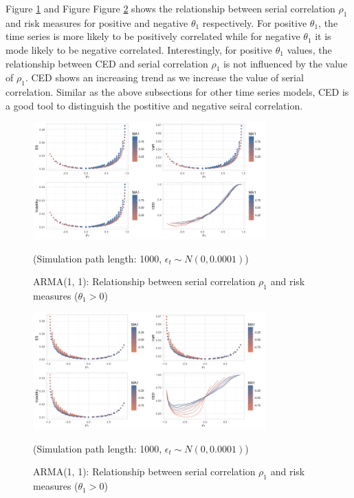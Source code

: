 \documentclass[11pt]{article}
\begin{document}
Figure \ref{fig:AR1MA1_risk_measures_pos} and Figure Figure \ref{fig:AR1MA1_risk_measures_neg} shows the relationship between serial correlation $\rho_1$ and risk measures for positive and negative $\theta_1$ respectively. For positive $\theta_1$, the time series is more likely to be positively correlated while for negative $\theta_1$ it is mode likely to be negative correlated. Interestingly, for positive $\theta_1$ values, the relationship between CED and serial correlation $\rho_1$ is not influenced by the value of $\rho_1$. CED shows an increasing trend as we increase the value of serial correlation. Similar as the above subsections for other time series models, CED is a good tool to distinguish the postitive and negative seiral correlation.

\begin{figure}[H]
\centering
\includegraphics[width = 0.8\textwidth]{../figures/simulation/AR1MA1_risk_measures_pos}
\caption{ARMA(1, 1): Relationship between serial correlation $\rho_1$ and risk measures ($\theta_1>0$)}
(Simulation path length: 1000, $\epsilon_t \sim N(0, 0.0001)$)
\label{fig:AR1MA1_risk_measures_pos}
\end{figure}

\begin{figure}[H]
\centering
\includegraphics[width = 0.8\textwidth]{../figures/simulation/AR1MA1_risk_measures_neg}
\caption{ARMA(1, 1): Relationship between serial correlation $\rho_1$ and risk measures ($\theta_1>0$)}
(Simulation path length: 1000, $\epsilon_t \sim N(0, 0.0001)$)
\label{fig:AR1MA1_risk_measures_neg}
\end{figure}
\end{document}
